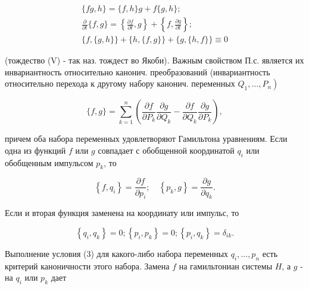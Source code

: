 \documentclass[10pt]{article}
\begin{document}
\[

\begin{gathered}

\{f g, h\}=\{f, h\} g+f\{g, h\} ; \\

\frac{\partial}{\partial t}\{f, g\}=\left\{\frac{\partial f}{\partial t}, g\right\}+\left\{f, \frac{\partial g}{\partial t}\right\} ; \\

\{f,\{g, h\}\}+\{h,\{f, g\}\}+\{g,\{h, f\}\} \equiv 0

\end{gathered}

\]



(тождество (V) - так наз. тождест во Якоби). Важным свойством П.с. является их инвариантность относительно канонич. преобразований (инвариантность относительно перехода к другому набору канонич. переменных $\left.Q_{1}, \ldots, P_{n}\right)$



\[

\{f, g\}=\sum_{k=1}^{n}\left(\frac{\partial f}{\partial P_{k}} \frac{\partial g}{\partial Q_{k}}-\frac{\partial f}{\partial Q_{k}} \frac{\partial g}{\partial P_{k}}\right),

\]



причем оба набора переменных удовлетворяют Гамильтона уравнениям. Если одна из функций $f$ или $g$ совпадает с обобщенной координатой $q_{i}$ или обобщенным импульсом $p_{k}$, то



\[

\left\{f, q_{i}\right\}=\frac{\partial f}{\partial p_{i}} ; \quad\left\{p_{k}, g\right\}=\frac{\partial g}{\partial q_{k}} .

\]



Если и вторая функция заменена на координату или импульс, то



\[

\left\{q_{i}, q_{k}\right\}=0 ;\left\{p_{i}, p_{k}\right\}=0 ;\left\{p_{i}, q_{k}\right\}=\delta_{i k} .

\]



Выполнение условия (3) для какого-либо набора переменных $q_{i}, \ldots, p_{n}$ есть критерий каноничности этого набора. Замена $f$ на гамильтониан системы $H$, а $g$ - на $q_{i}$ или $p_{k}$ дает
\end{document}
